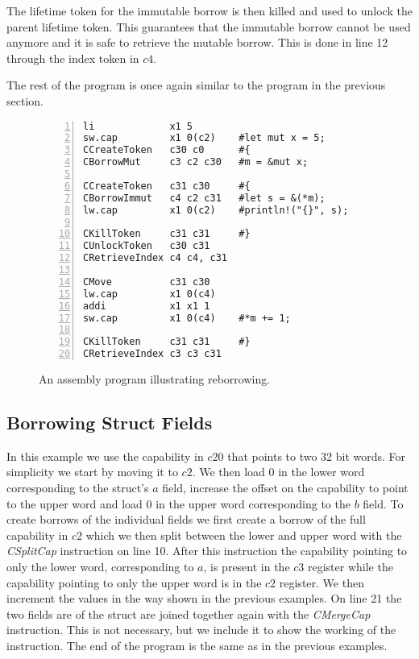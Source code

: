The lifetime token for the immutable borrow is then killed and used to unlock the parent lifetime token.
This guarantees that the immutable borrow cannot be used anymore and it is safe to retrieve the mutable borrow.
This is done in line 12 through the index token in $c4$.

The rest of the program is once again similar to the program in the previous section.
\begin{figure}[h]
\begin{lstlisting}[style=custASM, numbers = left ,xleftmargin=1.5em]
li             x1 5
sw.cap         x1 0(c2)    #let mut x = 5;
CCreateToken   c30 c0      #{
CBorrowMut     c3 c2 c30   #m = &mut x;

CCreateToken   c31 c30     #{
CBorrowImmut   c4 c2 c31   #let s = &(*m);
lw.cap         x1 0(c2)    #println!("{}", s);

CKillToken     c31 c31     #}
CUnlockToken   c30 c31
CRetrieveIndex c4 c4, c31

CMove          c31 c30
lw.cap         x1 0(c4)
addi           x1 x1 1
sw.cap         x1 0(c4)    #*m += 1;

CKillToken     c31 c31     #}
CRetrieveIndex c3 c3 c31
\end{lstlisting}
\caption{An assembly program illustrating reborrowing.}
\label{fig:asmreborrowexample}
\end{figure}

\subsection{Borrowing Struct Fields}
In this example we use the capability in $c20$ that points to two 32 bit words.
For simplicity we start by moving it to $c2$.
We then load 0 in the lower word corresponding to the struct's $a$ field, increase the offset on the capability to point to the upper word and load 0 in the upper word corresponding to the $b$ field.
To create borrows of the individual fields we first create a borrow of the full capability in $c2$ which we then split between the lower and upper word with the \textit{CSplitCap} instruction on line 10.
After this instruction the capability pointing to only the lower word, corresponding to $a$, is present in the $c3$ register while the capability pointing to only the upper word is in the $c2$ register.
We then increment the values in the way shown in the previous examples.
On line 21 the two fields are of the struct are joined together again with the \textit{CMergeCap} instruction.
This is not necessary, but we include it to show the working of the instruction.
The end of the program is the same as in the previous examples.


